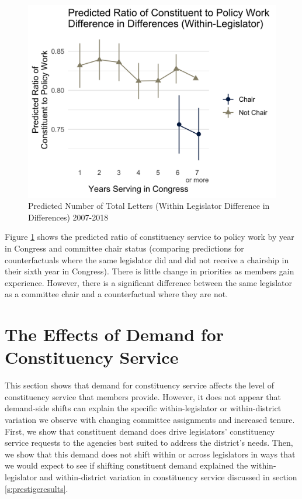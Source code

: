 \documentclass[12pt]{article}
\begin{document}
{\begin{figure}[hbt!]
\centering
\caption{Predicted Number of Total Letters (Within Legislator Difference in Differences) 2007-2018} \label{f:m-ratio-predicted}
\includegraphics[width = .8\textwidth]{figs/m-ratio-predicted-4}
\end{figure}

Figure \ref{f:m-ratio-predicted} shows the predicted ratio of constituency service to policy work by year in Congress and committee chair status (comparing predictions for counterfactuals where the same legislator did and did not receive a chairship in their sixth year in Congress). There is little change in priorities as members gain experience. However, there is a significant difference between the same legislator as a committee chair and a counterfactual where they are not.



\section{The Effects of Demand for Constituency Service}\label{s:demand} 

This section shows that demand for constituency service affects the level of constituency service that members provide. However, it does not appear that demand-side shifts can explain the specific within-legislator or within-district variation we observe with changing committee assignments and increased tenure. First, we show that constituent demand does drive legislators' constituency service requests to the agencies best suited to address the district's needs. Then, we show that this demand does not shift within or across legislators in ways that we would expect to see if shifting constituent demand explained the within-legislator and within-district variation in constituency service discussed in section \ref{s:prestigeresults}.

}
\end{document}
